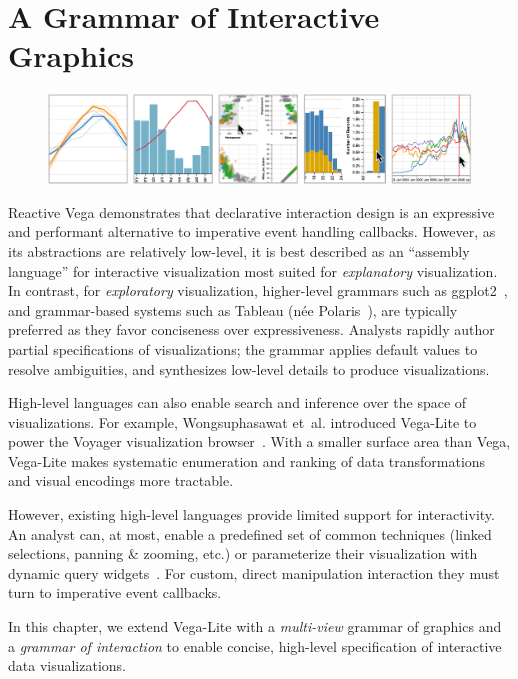\graphicspath{{./vega-lite/figures/}}
\chapter{A Grammar of Interactive Graphics}
\label{sec:vega-lite}

\begin{figure}[h!]
  \vspace{-40pt}
  \centering
  \includegraphics[width=0.9\columnwidth]{teaser}
\end{figure}


Reactive Vega demonstrates that declarative interaction design is an expressive
and performant alternative to imperative event handling callbacks. However, as
its abstractions are relatively low-level, it is best described as an ``assembly
language'' for interactive visualization most suited for \emph{explanatory}
visualization. In contrast, for \emph{exploratory} visualization, higher-level
grammars such as ggplot2~\cite{wickham:layered}, and grammar-based systems such
as Tableau (n\'ee Polaris~\cite{stolte:polaris}), are typically preferred as
they favor conciseness over expressiveness. Analysts rapidly author partial
specifications of visualizations; the grammar applies default values to resolve
ambiguities, and synthesizes low-level details to produce visualizations.

High-level languages can also enable search and inference over the space of
visualizations. For example, Wongsuphasawat et~al. introduced Vega-Lite to power
the Voyager visualization browser~\cite{voyager}. With a smaller surface area
than Vega, Vega-Lite makes systematic enumeration and ranking of data
transformations and visual encodings more tractable.

However, existing high-level languages provide limited support for
interactivity. An analyst can, at most, enable a predefined set of common
techniques (linked selections, panning \& zooming, etc.) or parameterize their
visualization with dynamic query widgets~\cite{shiny}. For custom, direct
manipulation interaction they must turn to imperative event callbacks.

In this chapter, we extend Vega-Lite with a \emph{multi-view} grammar of
graphics and a \emph{grammar of interaction} to enable concise, high-level
specification of interactive data visualizations.





